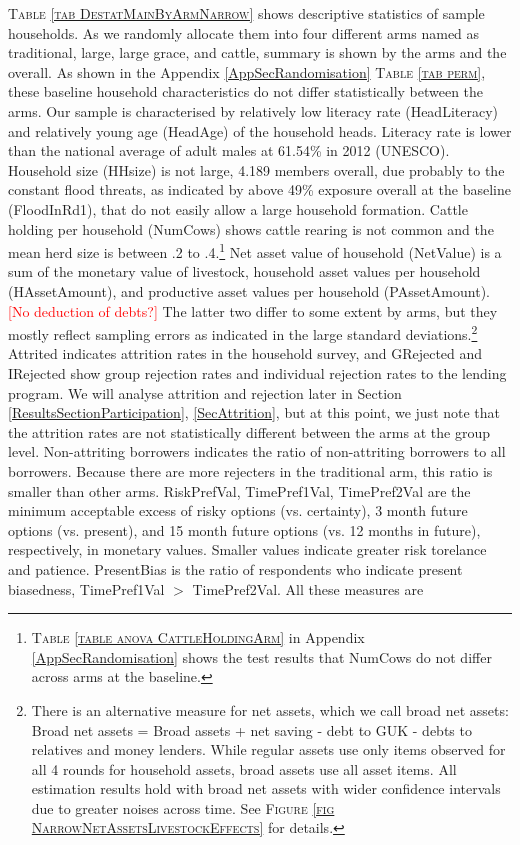 	\textsc{\small Table \ref{tab DestatMainByArmNarrow}} shows descriptive statistics of sample households. As we randomly allocate them into four different arms named as \textsf{traditional}, \textsf{large}, \textsf{large grace}, and \textsf{cattle}, summary is shown by the arms and the overall. As shown in the Appendix \ref{AppSecRandomisation} \textsc{\normalsize Table \ref{tab perm}}, these baseline household characteristics do not differ statistically between the arms. Our sample is characterised by relatively low literacy rate (\textsf{HeadLiteracy}) and relatively young age (\textsf{HeadAge}) of the household heads. Literacy rate is lower than the national average of adult males at 61.54\% in 2012 (UNESCO). Household size (\textsf{HHsize}) is not large, 4.189 members overall, due probably to the constant flood threats, as indicated by above 49\% exposure overall at the baseline (\textsf{FloodInRd1}), that do not easily allow a large household formation. Cattle holding per household (\textsf{NumCows}) shows cattle rearing is not common and the mean herd size is between .2 to .4.\footnote{ \textsc{Table \ref{table anova CattleHoldingArm}} in Appendix \ref{AppSecRandomisation} shows the test results that \textsf{NumCows} do not differ across arms at the baseline. } Net asset value of household (\textsf{NetValue}) is a sum of the monetary value of livestock, household asset values per household (\textsf{HAssetAmount}), and productive asset values per household (\textsf{PAssetAmount}). \textcolor{red}{[No deduction of debts?]} The latter two differ to some extent by arms, but they mostly reflect sampling errors as indicated in the large standard deviations.\footnote{There is an alternative measure for net assets, which we call broad net assets: Broad net assets = Broad assets + net saving - debt to GUK - debts to relatives and money lenders. While regular assets use only items observed for all 4 rounds for household assets, broad assets use all asset items. All estimation results hold with broad net assets with wider confidence intervals due to greater noises across time. See \textsc{\footnotesize Figure \ref{fig NarrowNetAssetsLivestockEffects}} for details. } \textsf{Attrited} indicates attrition rates in the household survey, and \textsf{GRejected} and \textsf{IRejected} show group rejection rates and individual rejection rates to the lending program. We will analyse attrition and rejection later in Section \ref{ResultsSectionParticipation}, \ref{SecAttrition}, but at this point, we just note that the attrition rates are not statistically different between the arms at the group level. \textsf{Non-attriting borrowers} indicates the ratio of non-attriting borrowers to all borrowers. Because there are more rejecters in the \textsf{traditional} arm, this ratio is smaller than other arms. \textsf{RiskPrefVal, TimePref1Val, TimePref2Val} are the minimum acceptable excess of risky options (vs. certainty), 3 month future options (vs. present), and 15 month future options (vs. 12 months in future), respectively, in monetary values. \label{StudySamplePrefDescription} Smaller values indicate greater risk torelance and patience. \textsf{PresentBias} is the ratio of respondents who indicate present biasedness, \textsf{TimePref1Val} $>$ \textsf{TimePref2Val}. All these measures are 